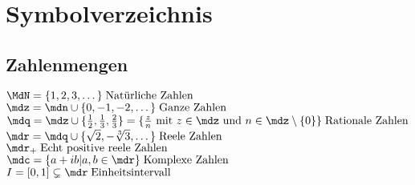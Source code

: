 

\chapter*{Symbolverzeichnis}


\section*{Zahlenmengen}

$	\MdN = \{ 1, 2, 3, \dots \}  \; \text{Natürliche Zahlen} 					$ \\
$	\mdz = \mdn \cup \{ 0, -1, -2, \dots \}  \; \text{Ganze Zahlen} 				$ \\
$	\mdq = \mdz \cup \{ \frac{1}{2}, \frac{1}{3}, \frac{2}{3} \} = \{ \frac{z}{n} \text{ mit } z \in \mdz \text{ und } n \in \mdz \setminus \{ 0 \} \}  \;\text{Rationale Zahlen} 		$ \\
$	\mdr = \mdq \cup \{ \sqrt{2}, -\sqrt[3]{3}, \dots \}  \; \text{Reele Zahlen}$ \\
$	\mdr_+\; \text{Echt positive reele Zahlen}					$ \\
$	\mdc = \{a+ib|a,b \in \mdr \} \; \text{Komplexe Zahlen}	$ \\
$	I = [0,1] \subsetneq \mdr \; \text{Einheitsintervall}	$	